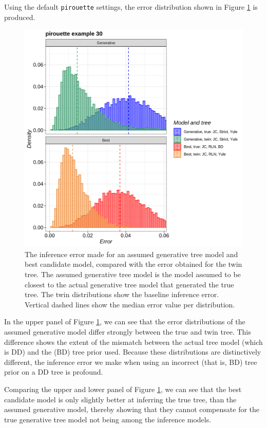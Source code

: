Using the default \verb;pirouette; settings,
the error distribution shown in Figure \ref{fig:example_30}
is produced.

\begin{figure}[H]
  \includegraphics[width=\textwidth]{pirouette_example_30/errors.png}
  \caption{
    The inference error made 
    for an assumed generative tree model and best candidate model,
    compared with the error obtained for the twin tree.
    The assumed generative tree model is the model assumed to be closest to
    the actual generative tree model that generated the true tree.
    The twin distributions show the baseline inference error.
    Vertical dashed lines show the median error value per distribution.
  }
  \label{fig:example_30}
\end{figure}

In the upper panel of Figure \ref{fig:example_30},
we can see that the error distributions of the assumed generative model
differ strongly between the true and twin tree. 
This difference shows the extent of the mismatch between
the actual tree model (which is DD) and the (BD) tree prior used.
Because these distributions are distinctively different,
the inference error we make when using an 
incorrect (that is, BD) tree prior on a DD tree
is profound.

Comparing the upper and lower panel of Figure \ref{fig:example_30}, 
we can see that the best
candidate model is only slightly better at inferring the true tree,
than the assumed generative model, thereby showing that they cannot compensate for the true generative tree model not being among the inference models.

